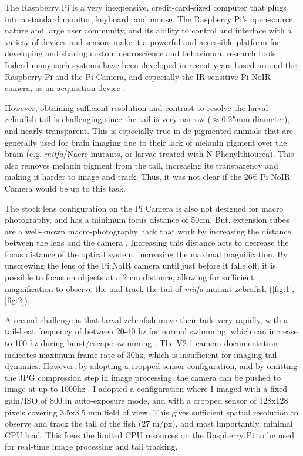 \documentclass[9pt,lineno]{RandlettLab_elife}
\begin{document}
The Raspberry Pi is a very inexpensive, credit-card-sized computer that plugs into a standard monitor, keyboard, and mouse. The Raspberry Pi's open-source nature and large user community, and its ability to control and interface with a variety of devices and sensors make it a powerful and accessible platform for developing and sharing custom neuroscience and behavioural research tools. Indeed many such systems have been developed in recent years based around the Raspberry Pi and the Pi Camera, and especially the IR-sensitive Pi NoIR camera, as an acquisition device \citep{Geissmann2017-gd, Maia_Chagas2017-mf, Saunders2019-ka, Tadres2020-as, Broussard2022-yd}. 

However, obtaining sufficient resolution and contrast to resolve the larval zebrafish tail is challenging since the tail is very narrow ($\approx$0.25mm diameter), and nearly transparent. This is especially true in de-pigmented animals that are generally used for brain imaging due to their lack of melanin pigment over the brain (e.g. \textit{mitfa}/Nacre mutants, or larvae treated with N-Phenylthiourea). This also removes melanin pigment from the tail, increasing its transparency and making it harder to image and track. Thus, it was not clear if the 26€ Pi NoIR Camera would be up to this task. 

The stock lens configuration on the Pi Camera is also not designed for macro photography, and has a minimum focus distance of 50cm. But, extension tubes are a well-known macro-photography hack that work by increasing the distance between the lens and the camera \citep{enwiki:1118116052}. Increasing this distance acts to decrease the focus distance of the optical system, increasing the maximal magnification. By unscrewing the lens of the Pi NoIR camera until just before it falls off, it is possible to focus on objects at a 2 cm distance, allowing for sufficient magnification to observe the and track the tail of \textit{mitfa} mutant zebrafish (\autoref{fig:1}, \autoref{fig:2}).



A second challenge is that larval zebrafish move their tails very rapidly, with a tail-beat frequency of between 20-40 hz for normal swimming, which can increase to 100 hz during burst/escape swimming \citep{Budick2000-bq, Muller2004-st, Severi2014-iw}. The V2.1 camera documentation indicates maximum frame rate of 30hz, which is insufficient for imaging tail dynamics. However, by adopting a cropped sensor configuration, and by omitting the JPG compression step in image processing, the camera can be pushed to image at up to 1000hz \citep{660hz}. I adopted a configuration where I imaged with a fixed gain/ISO of 800 in auto-exposure mode, and with a cropped sensor of 128x128 pixels covering 3.5x3.5 mm field of view. This gives sufficient spatial resolution to observe and track the tail of the fish (27 \micro m/px), and most importantly, minimal CPU load. This frees the limited CPU resources on the Raspberry Pi to be used for real-time image processing and tail tracking. 
\end{document}

